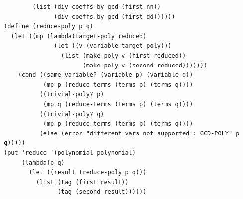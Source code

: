 \documentclass[final,fleqn,titlepage,twoside]{article}
\begin{document}
\begin{verbatim}
        (list (div-coeffs-by-gcd (first nn))
              (div-coeffs-by-gcd (first dd))))))
(define (reduce-poly p q)
  (let ((mp (lambda(target-poly reduced)
              (let ((v (variable target-poly)))
                (list (make-poly v (first reduced))
                      (make-poly v (second reduced)))))))
    (cond ((same-variable? (variable p) (variable q))
           (mp p (reduce-terms (terms p) (terms q))))
          ((trivial-poly? p)
           (mp q (reduce-terms (terms p) (terms q))))
          ((trivial-poly? q)
           (mp p (reduce-terms (terms p) (terms q))))
          (else (error "different vars not supported : GCD-POLY" p q)))))
(put 'reduce '(polynomial polynomial)
     (lambda(p q)
       (let ((result (reduce-poly p q)))
         (list (tag (first result))
               (tag (second result))))))
\end{verbatim}
\end{document}
